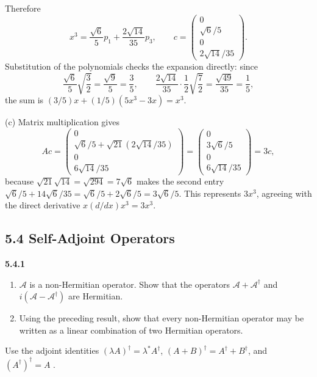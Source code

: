 Therefore
\[
\boxed{x^3=\frac{\sqrt6}{5}p_1+\frac{2\sqrt{14}}{35}p_3},
\qquad c=\begin{pmatrix}0\\\sqrt6/5\\0\\2\sqrt{14}/35\end{pmatrix}.
\]
Substitution of the polynomials checks the expansion directly: since
\[
\frac{\sqrt6}5\sqrt{\frac32}=\frac{\sqrt9}5=\frac35,\qquad
\frac{2\sqrt{14}}{35}\cdot\frac12\sqrt{\frac72}=\frac{\sqrt{49}}{35}
=\frac15,
\]
the sum is $(3/5)x+(1/5)(5x^3-3x)=x^3$.

(c) Matrix multiplication gives
\[
Ac=\begin{pmatrix}
0\\ \sqrt6/5+\sqrt{21}(2\sqrt{14}/35)\\0\\6\sqrt{14}/35
\end{pmatrix}
=\begin{pmatrix}0\\3\sqrt6/5\\0\\6\sqrt{14}/35\end{pmatrix}=3c,
\]
because $\sqrt{21}\sqrt{14}=\sqrt{294}=7\sqrt6$ makes the second entry
$\sqrt6/5+14\sqrt6/35=\sqrt6/5+2\sqrt6/5=3\sqrt6/5$.
This represents $3x^3$, agreeing with the direct derivative
$x(d/dx)x^3=3x^3$.

\subsection*{5.4 Self-Adjoint Operators}

\par\bigskip
\noindent\textbf{5.4.1}\quad
{}
\begin{enumerate}
\item[(a)] $\mathcal{A}$ is a non-Hermitian operator. Show that the operators
  $\mathcal{A}+\mathcal{A}^{\dagger}$ and $i(\mathcal{A}
  -\mathcal{A}^{\dagger})$ are Hermitian.
\item[(b)] Using the preceding result, show that every non-Hermitian operator
  may be written as a linear combination of two Hermitian operators.
\end{enumerate}
\solution
Use the adjoint identities $(\lambda A)^\dagger=\lambda^*A^\dagger$,
$(A+B)^\dagger=A^\dagger+B^\dagger$, and
$(A^\dagger)^\dagger=A$ .

